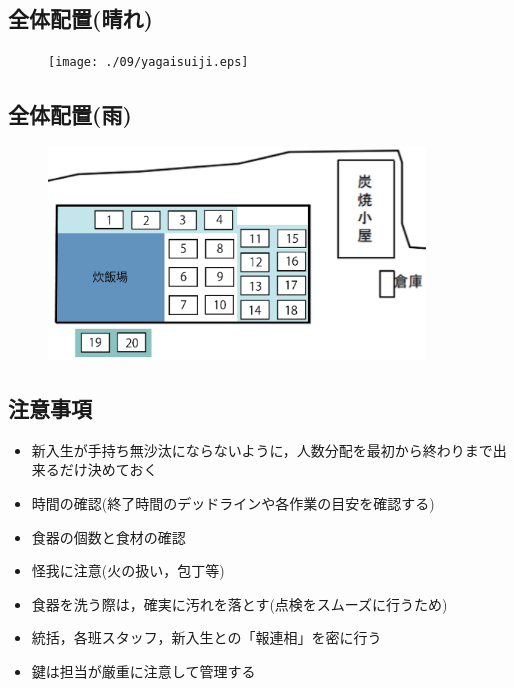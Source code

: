 \subsection{全体配置(晴れ)}
\begin{figure}[h]
\begin{center}
\texttt{[image: ./09/yagaisuiji.eps]}
\end{center}
\end{figure}

\subsection{全体配置(雨)}
\begin{figure}[h]
\begin{center}
\includegraphics[width = 10cm]{./09/yagaisuijirain.eps}
\end{center}
\end{figure}


\subsection{注意事項}
\begin{itemize}
  \item 新入生が手持ち無沙汰にならないように，人数分配を最初から終わりまで出来るだけ決めておく
  \item 時間の確認(終了時間のデッドラインや各作業の目安を確認する)
  \item 食器の個数と食材の確認
  \item 怪我に注意(火の扱い，包丁等)
  \item 食器を洗う際は，確実に汚れを落とす(点検をスムーズに行うため)
  \item 統括，各班スタッフ，新入生との「報連相」を密に行う
  \item 鍵は担当が厳重に注意して管理する
\end{itemize}


